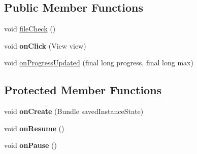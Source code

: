 \subsection*{Public Member Functions}
\begin{DoxyCompactItemize}
\item 
void \hyperlink{classcom_1_1example_1_1android_1_1wearable_1_1wcldemo_1_1pages_1_1FileTransferActivity_ab5d34a68bab9687e8c6c6728078b1787}{file\+Check} ()
\item 
void {\bfseries on\+Click} (View view)\hypertarget{classcom_1_1example_1_1android_1_1wearable_1_1wcldemo_1_1pages_1_1FileTransferActivity_a9e8bcc2ee814cbb77934257f8094861b}{}\label{classcom_1_1example_1_1android_1_1wearable_1_1wcldemo_1_1pages_1_1FileTransferActivity_a9e8bcc2ee814cbb77934257f8094861b}

\item 
void \hyperlink{classcom_1_1example_1_1android_1_1wearable_1_1wcldemo_1_1pages_1_1FileTransferActivity_a1d913d854d84ec830dc2bc724d580bef}{on\+Progress\+Updated} (final long progress, final long max)
\end{DoxyCompactItemize}
\subsection*{Protected Member Functions}
\begin{DoxyCompactItemize}
\item 
void {\bfseries on\+Create} (Bundle saved\+Instance\+State)\hypertarget{classcom_1_1example_1_1android_1_1wearable_1_1wcldemo_1_1pages_1_1FileTransferActivity_a850d1ecdeb1eeab869a6775c2b06f8ad}{}\label{classcom_1_1example_1_1android_1_1wearable_1_1wcldemo_1_1pages_1_1FileTransferActivity_a850d1ecdeb1eeab869a6775c2b06f8ad}

\item 
void {\bfseries on\+Resume} ()\hypertarget{classcom_1_1example_1_1android_1_1wearable_1_1wcldemo_1_1pages_1_1FileTransferActivity_a722d42846eabd9a70e5cc9d0b534247d}{}\label{classcom_1_1example_1_1android_1_1wearable_1_1wcldemo_1_1pages_1_1FileTransferActivity_a722d42846eabd9a70e5cc9d0b534247d}

\item 
void {\bfseries on\+Pause} ()\hypertarget{classcom_1_1example_1_1android_1_1wearable_1_1wcldemo_1_1pages_1_1FileTransferActivity_a1a7be84800a05c0f9c69f842c50dafc7}{}\label{classcom_1_1example_1_1android_1_1wearable_1_1wcldemo_1_1pages_1_1FileTransferActivity_a1a7be84800a05c0f9c69f842c50dafc7}

\end{DoxyCompactItemize}


